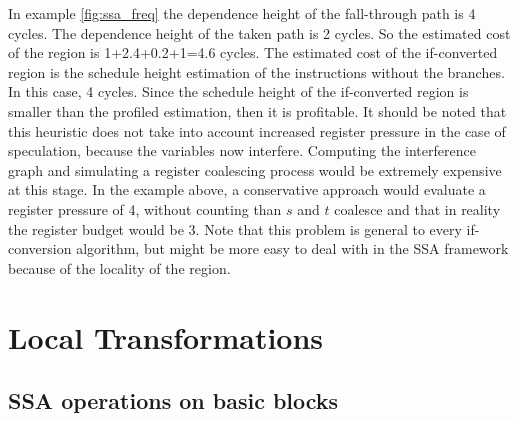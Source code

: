 In example \ref{fig:ssa_freq} the dependence height of the fall-through path is 4 cycles. The dependence height of the taken path is 2 cycles. So the estimated cost of the region is 1+2.4+0.2+1=4.6 cycles. The estimated cost of the if-converted region is the schedule height estimation of the instructions without the branches. In this case, 4 cycles. Since the schedule height of the if-converted region is smaller than the profiled estimation, then it is profitable.
It should be noted that this heuristic does not take into account increased register pressure in the case of speculation, because the variables now interfere. Computing the interference graph and simulating a register coalescing process would be extremely expensive at this stage. In the example above, a conservative approach would evaluate a register pressure of 4, without counting than $s$ and $t$ coalesce and that in reality the register budget would be 3. Note that this problem is general to every if-conversion algorithm, but might be more easy to deal with in the SSA framework because of the locality of the region.

\section{Local Transformations}

\subsection{SSA operations on basic blocks}


